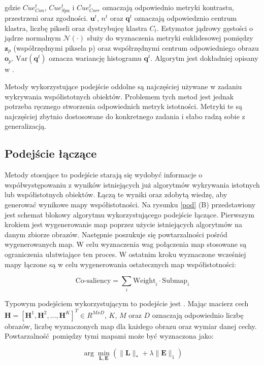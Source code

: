 \documentclass[a4paper,12pt,twoside,openany]{report}
\begin{document}
	gdzie $Cue^t_{Con}$, $Cue^t_{Spa}$ i $Cue^t_{Corr}$ oznaczają odpowiednio metryki kontrastu, przestrzeni oraz zgodności. $\mathbf{u}^t$, $n^t$ oraz $\mathbf{q}^t$ oznaczają odpowiedznio centrum klastra, liczbę pikseli oraz dystrybujcę klastra $C_t$. Estymator jądrowy gęstości o jądrze normalnym $\mathcal{N}(\cdot)$ służy do wyznaczenia metryki euklidesowej pomiędzy $\mathbf{z}_p$ (współrzędnymi piksela p) oraz współrzędnymi centrum odpowiedniego obrazu $\mathbf{o}_p$. $\text{Var}\left(\mathbf{q}^t\right)$ oznacza wariancję histogramu $\mathbf{q}^t$. Algorytm jest dokładniej opisany w \cite{bott}.

	Metody wykorzystujące podejście oddolne są najczęściej używane w zadaniu wykrywania współistotnych obiektów. Problemem tych metod jest jednak potrzeba ręcznego stworzenia odpowiednich metryk istotności. Metryki te są najczęściej zbytnio dostosowane do konkretnego zadania i słabo radzą sobie z generalizacją.

	\subsection{Podejście łączące}
	Metody stosujące to podejście starają się wydobyć informacje o współwystępowaniu z wyników istniejących już algorytmów wykrywania istotnych lub współistotnych obiektów. Łączą te wyniki oraz zdobytą wiedzę, aby generować wynikowe mapy współistotności. Na rysunku \ref{pod} (B) przedstawiony jest schemat blokowy algorytmu wykorzystującego podejście łączące. Pierwszym krokiem jest wygenerowanie map poprzez użycie istniejących algorytmów na danym zbiorze obrazów. Następnie poszukuje się powtarzalności pośród wygenerowanych map. W celu wyznaczenia wag połączenia map stosowane są ograniczenia ułatwiające ten proces. W ostatnim kroku wyznaczone wcześniej mapy łączone są w celu wygenerowania ostatecznych map współistotności:

	$$
	\text{Co-saliency} = \sum_i \text{Weight}_i \cdot \text{Submap}_i
	$$

	Typowym podejściem wykorzystującym to podejście jest \cite{midfeatex}. Mając macierz cech $\mathbf{H} = [\mathbf{H}^1, \mathbf{H}^2, \dots, \mathbf{H}^K]^T \in R^{M x D}$, $K$, $M$ oraz $D$ oznaczają odpowiednio liczbę obrazów, liczbę wyznaczonych map dla każdego obrazu oraz wymiar danej cechy. Powtarzalność pomiędzy tymi mapami może być wyznaczona jako:

	$$
	\arg\min_{\mathbf{L}, \mathbf{E}} \left(\|\mathbf{L}\|_* + \lambda\|\mathbf{E}\|_1\right)
	$$
\end{document}

